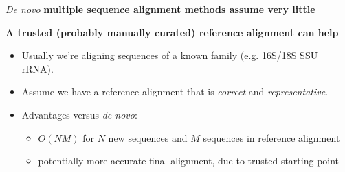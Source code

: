 \documentclass[landscape]{slides}
\begin{document}
\begin{slide}
\begin{center}
\emph{De novo} \textbf{multiple sequence alignment methods assume very little}
\end{center}


\vfill
\end{slide}
\begin{slide}
\begin{center}
\textbf{A trusted (probably manually curated) reference alignment can help}
\end{center}

\small
\begin{itemize} 
\item Usually we're aligning sequences of a known family (e.g. 16S/18S SSU rRNA).
\item Assume we have a reference alignment that is \emph{correct} and \emph{representative}.
\item Advantages versus \emph{de novo}: 
\begin{itemize} 
  \item $O(NM)$ for $N$ new sequences and $M$ sequences in reference
  alignment
  \item potentially more accurate final alignment, due to trusted
  starting point
\end{itemize}
\end{itemize}

\vfill
\end{slide}
\end{document}
